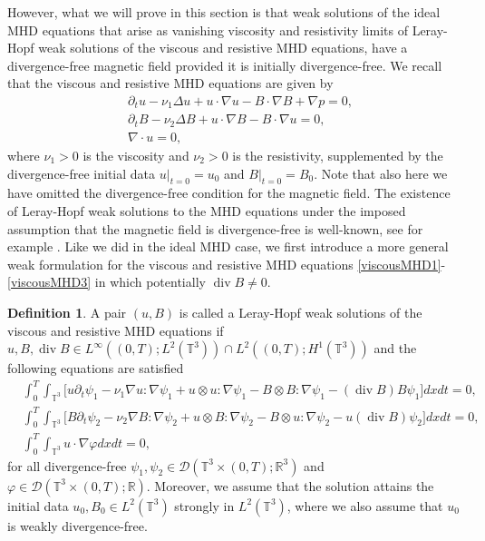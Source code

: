 \documentclass[12pt,a4paper]{article}
\theoremstyle{definition}
\newtheorem{definition}[theorem]{Definition}
\theoremstyle{remark}
\numberwithin{equation}{section}
\DeclareMathOperator{\Div}{div}
\begin{document}
However, what we will prove in this section is that weak solutions of the ideal MHD equations that arise as vanishing viscosity and resistivity limits of Leray-Hopf weak solutions of the viscous and resistive MHD equations, have a divergence-free magnetic field provided it is initially divergence-free. We recall that the viscous and resistive MHD equations are given by
\begin{align}
&\partial_t u - \nu_1 \Delta u + u \cdot \nabla u - B \cdot \nabla B + \nabla p = 0, \label{viscousMHD1} \\ 
&\partial_t B - \nu_2 \Delta B + u \cdot \nabla B - B \cdot \nabla u = 0, \label{viscousMHD2} \\
&\nabla \cdot u = 0, \label{viscousMHD3}
\end{align}
where $\nu_1 > 0$ is the viscosity and $\nu_2 > 0$ is the resistivity, supplemented by the divergence-free initial data $u \lvert_{t = 0} = u_0$ and $B \lvert_{t = 0} = B_0$. Note that also here we have omitted the divergence-free condition for the magnetic field. The existence of Leray-Hopf weak solutions to the MHD equations under the imposed assumption that the magnetic field is divergence-free is well-known, see for example \cite{sermange,wu}. Like we did in the ideal MHD case, we first introduce a more general weak formulation for the viscous and resistive MHD equations \eqref{viscousMHD1}-\eqref{viscousMHD3} in which potentially $\Div B \neq 0$.
\begin{definition} \label{viscoussolutiondef}
A pair $(u,B)$ is called a Leray-Hopf weak solutions of the viscous and resistive MHD equations if $u, B, \Div B \in L^\infty ((0,T); L^2 (\mathbb{T}^3)) \cap L^2 ((0,T);H^1(\mathbb{T}^3))$ and the following equations are satisfied
\begin{align}
&\int_0^T \int_{\mathbb{T}^3} \bigg[ u \partial_t \psi_1 - \nu_1 \nabla u : \nabla \psi_1 + u \otimes u : \nabla \psi_1 - B \otimes B : \nabla \psi_1 - (\Div B ) B \psi_1 \bigg] dx dt = 0, \label{viscousmhdweakform1} \\
&\int_0^T \int_{\mathbb{T}^3} \bigg[ B \partial_t \psi_2 - \nu_2 \nabla B : \nabla \psi_2 + u \otimes B : \nabla \psi_2 - B \otimes u : \nabla \psi_2 - u (\Div B) \psi_2 \bigg] dx dt = 0, \label{viscousmhdweakform2} \\
&\int_0^T \int_{\mathbb{T}^3} u \cdot \nabla \varphi dx dt = 0, \label{viscousmhdweakform3}
\end{align}
for all divergence-free $\psi_1, \psi_2 \in \mathcal{D} (\mathbb{T}^3 \times (0,T); \mathbb{R}^3)$ and $\varphi \in \mathcal{D} (\mathbb{T}^3 \times (0,T);\mathbb{R})$. Moreover, we assume that the solution attains the initial data $u_0, B_0 \in L^2 (\mathbb{T}^3)$ strongly in $L^2 (\mathbb{T}^3)$, where we also assume that $u_0$ is weakly divergence-free.
\end{definition}
\end{document}
